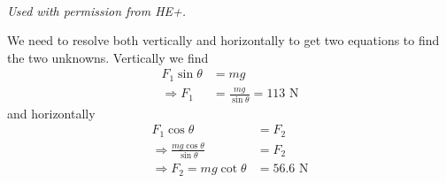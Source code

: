
\begin{problem}[HE+_Block]
{
\\
}
{\textit{Used with permission from HE+.}}
{
We need to resolve both vertically and horizontally to get two equations to find the two unknowns. Vertically we find
\begin{align*}
F_1\sin\theta&=mg \\
\Rightarrow F_1&=\frac{mg}{\sin\theta}=113\textrm{ N}
\end{align*}
and horizontally
\begin{align*}
F_1\cos\theta&=F_2 \\
\Rightarrow \frac{mg\cos\theta}{\sin\theta}&=F_2 \\
\Rightarrow F_2=mg\cot\theta&=56.6\textrm{ N}
\end{align*}

}
\end{problem}